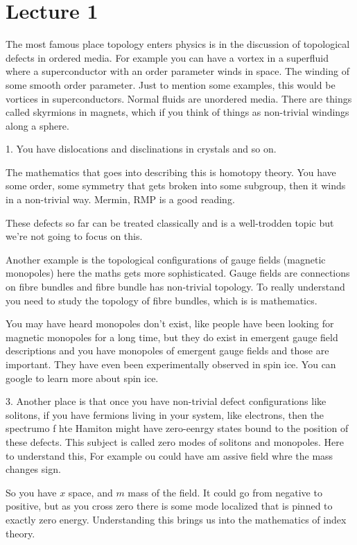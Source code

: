 \section{Lecture 1}
The most famous place topology enters physics is in the discussion of
topological defects in ordered media.
For example you can have a vortex in a superfluid where a superconductor with an
order parameter winds in space.
The winding of some smooth order parameter.
Just to mention some examples, this would be vortices in superconductors.
Normal fluids are unordered media.
There are things called skyrmions in magnets, which if you think of things as
non-trivial windings along a sphere.

1. You have dislocations and disclinations in crystals and so on.


The mathematics that goes into describing this is homotopy theory.
You have some order, some symmetry that gets broken into some subgroup, then
it winds in a non-trivial way.
Mermin, RMP is a good reading.

These defects so far can be treated classically and is a well-trodden topic but
we're not going to focus on this.


Another example is the topological configurations of gauge fields
(magnetic monopoles) here the maths gets more sophisticated.
Gauge fields are connections on fibre bundles and fibre bundle has non-trivial
topology.
To really understand you need to study the topology of fibre bundles,
which is is mathematics.

You may have heard monopoles don't exist, like people have been looking for
magnetic monopoles for a long time, but they do exist in emergent gauge field
descriptions and you have monopoles of emergent gauge fields and those are
important.
They have even been experimentally observed in spin ice.
You can google to learn more about spin ice.

3.
Another place is that once you have non-trivial defect configurations like
solitons, if you have fermions living in your system, like electrons, then the
spectrumo f hte Hamiton might have zero-eenrgy states bound to the position of
these defects.
This subject is called zero modes of solitons and monopoles.
Here to understand this,
For example ou could have am assive field whre the mass changes sign.

So you have $x$ space, and $m$ mass of the field. It could go from negative to
positive, but as you cross zero there is some mode localized that is pinned to
exactly zero energy.
Understanding this brings us into the mathematics of index theory.



